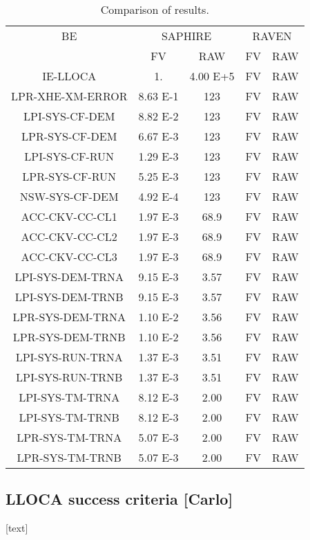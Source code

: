 \begin{table}
	\centering
	\caption{Comparison of results.}
	\begin{tabular}{*5c}
		\hline
		BE &  \multicolumn{2}{c}{SAPHIRE}     & \multicolumn{2}{c}{RAVEN}\\
		{}               &  FV        &  RAW       &  FV        &  RAW        \\
		\hline
	    IE-LLOCA         &  1.        &  4.00 E+5  &  FV  & RAW  \\ 
	    LPR-XHE-XM-ERROR &  8.63 E-1  &  123       &  FV  & RAW  \\
	    LPI-SYS-CF-DEM   &  8.82 E-2  &  123       &  FV  & RAW  \\ 
	    LPR-SYS-CF-DEM   &  6.67 E-3  &  123       &  FV  & RAW  \\ 
	    LPI-SYS-CF-RUN   &  1.29 E-3  &  123       &  FV  & RAW  \\
	    LPR-SYS-CF-RUN   &  5.25 E-3  &  123       &  FV  & RAW  \\
	    NSW-SYS-CF-DEM   &  4.92 E-4  &  123       &  FV  & RAW  \\
	    ACC-CKV-CC-CL1   &  1.97 E-3  &  68.9      &  FV  & RAW  \\
	    ACC-CKV-CC-CL2   &  1.97 E-3  &  68.9      &  FV  & RAW  \\
	    ACC-CKV-CC-CL3   &  1.97 E-3  &  68.9      &  FV  & RAW  \\
	    LPI-SYS-DEM-TRNA &  9.15 E-3  &  3.57      &  FV  & RAW  \\
	    LPI-SYS-DEM-TRNB &  9.15 E-3  &  3.57      &  FV  & RAW  \\
	    LPR-SYS-DEM-TRNA &  1.10 E-2  &  3.56      &  FV  & RAW  \\
	    LPR-SYS-DEM-TRNB &  1.10 E-2  &  3.56      &  FV  & RAW  \\
	    LPI-SYS-RUN-TRNA &  1.37 E-3  &  3.51      &  FV  & RAW  \\
	    LPI-SYS-RUN-TRNB &  1.37 E-3  &  3.51      &  FV  & RAW  \\
	    LPI-SYS-TM-TRNA  &  8.12 E-3  &  2.00      &  FV  & RAW  \\
	    LPI-SYS-TM-TRNB  &  8.12 E-3  &  2.00      &  FV  & RAW  \\
	    LPR-SYS-TM-TRNA  &  5.07 E-3  &  2.00      &  FV  & RAW  \\
	    LPR-SYS-TM-TRNB  &  5.07 E-3  &  2.00      &  FV  & RAW  \\
		\hline
	\end{tabular}
\end{table}


\subsection{LLOCA success criteria [Carlo]}

[text]

